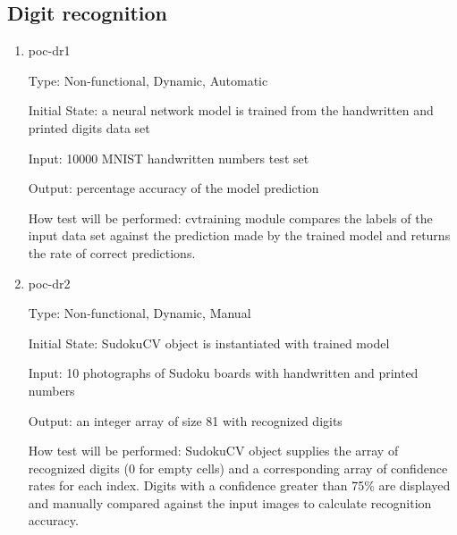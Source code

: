 \documentclass[11pt]{article}
\begin{document}
\subsection{Digit recognition}
\begin{enumerate}

\item{poc-dr1\\}

Type: Non-functional, Dynamic, Automatic
					
Initial State: a neural network model is trained from the handwritten and printed digits data set
					
Input: 10000 MNIST handwritten numbers test set
					
Output: percentage accuracy of the model prediction
					
How test will be performed: cvtraining module compares the labels of the input data set against the prediction made by the trained model and returns the rate of correct predictions.

\item{poc-dr2\\}

Type: Non-functional, Dynamic, Manual
					
Initial State: SudokuCV object is instantiated with trained model
					
Input: 10 photographs of Sudoku boards with handwritten and printed numbers
					
Output: an integer array of size 81 with recognized digits
					
How test will be performed: SudokuCV object supplies the array of recognized digits (0 for empty cells) and a corresponding array of confidence rates for each index. Digits with a confidence greater than 75\% are displayed and manually compared against the input images to calculate recognition accuracy.

\end{enumerate}
\end{document}
